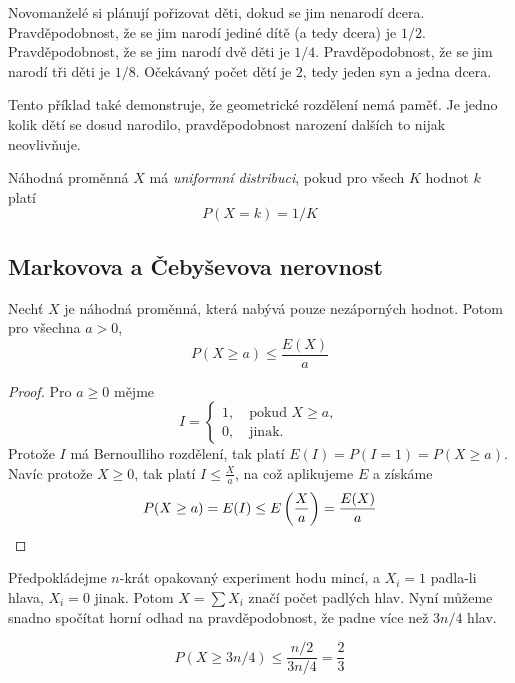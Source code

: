 \begin{example}
    Novomanželé si plánují pořizovat děti, dokud se jim nenarodí dcera.
    Pravděpodobnost, že se jim narodí jediné dítě (a tedy dcera) je $1/2$.
    Pravděpodobnost, že se jim narodí dvě děti je $1/4$.
    Pravděpodobnost, že se jim narodí tři děti je $1/8$.
    Očekávaný počet dětí je $2$, tedy jeden syn a jedna dcera.

    Tento příklad také demonstruje, že geometrické rozdělení nemá paměť.
    Je jedno kolik dětí se dosud narodilo, pravděpodobnost narození
    dalších to nijak neovlivňuje.
\end{example}

\begin{definition}
    Náhodná proměnná $X$ má {\em uniformní distribuci},
    pokud pro všech $K$ hodnot $k$ platí
    \[
        P(X = k) = 1/K
    \]
\end{definition}

\subsection{Markovova a Čebyševova nerovnost}

\begin{theorem}
    Nechť $X$ je náhodná proměnná, která nabývá pouze nezáporných
    hodnot. Potom pro všechna $a > 0$,
    \[
       P(X \geq a) \leq \frac{E(X)}{a}
\]
\end{theorem}

\begin{proof}
    Pro $a \geq 0$ mějme
    \[
        I =
        \begin{cases}
            1, \quad \text{pokud } X \geq a, \\
            0, \quad \text{jinak.}
        \end{cases}
    \]
    Protože $I$ má Bernoulliho rozdělení, tak platí $E(I) = P(I = 1) = P(X \geq a)$.
    Navíc protože $X \geq 0$, tak platí $I \leq \frac{X}{a}$, na což
    aplikujeme $E$ a získáme
    \[
        P(X \geq a) = E(I) \leq E \left(\frac{X}{a} \right) = \frac{E(X)}{a}
        \qedhere
    \]
\end{proof}

\begin{example}
    Předpokládejme $n$-krát opakovaný experiment hodu mincí,
    a $X_i = 1$ padla-li hlava, $X_i = 0$ jinak.
    Potom $X = \sum X_i$ značí počet padlých hlav. Nyní můžeme snadno
    spočítat horní odhad na pravděpodobnost, že padne více než $3n/4$
    hlav.

    \[
        P(X \geq 3n/4) \leq \frac{n/2}{3n/4} = \frac{2}{3}
    \]
\end{example}

